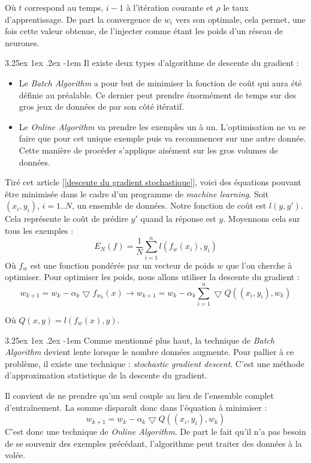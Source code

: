 \documentclass[a4paper, 11pt]{article}
\makeatletter
\renewcommand\paragraph{\@startsection{paragraph}{5}{\z@}%
  {3.25ex \@plus1ex \@minus.2ex}%
  {-1em}%
  {\normalfont\normalsize\bfseries}}
\makeatother
\begin{document}
Où $t$ correspond au temps, $i-1$ à l'itération courante et $\rho$ le taux d'apprentissage.
De part la convergence de $w_i$ vers son optimale, cela permet, une fois cette valeur obtenue, de l'injecter comme étant les poids d'un réseau de neurones.

\paragraph{}
Il existe deux types d'algorithme de descente du gradient :
\begin{itemize}
\item Le \textit{Batch Algorithm} a pour but de minimiser la fonction de coût qui aura été définie au préalable. Ce dernier peut prendre énormément de temps sur des gros jeux de données de par son côté itératif.
\item Le \textit{Online Algorithm} va prendre les exemples un à un. L'optimisation ne va se faire que pour cet unique exemple puis va recommencer sur une autre donnée. Cette manière de procéder s'applique aisément sur les gros volumes de données.
\end{itemize}

Tiré cet article [\ref{descente du gradient stochastique}], voici des équations pouvant être minimisée dans le cadre d'un programme de \textit{machine learning}.
Soit $(x_i,y_i)\text{,\ } i=1..N$, un ensemble de données. Notre fonction de coût est $l(y,y')$. Cela représente le coût de prédire $y'$ quand la réponse est $y$. Moyennons cela sur tous les exemples :
$$E_N(f) = \frac{1}{N} \sum_{i=1}^{n}l(f_w(x_i),y_i)$$
Où $f_w$ est une fonction pondérée par un vecteur de poids $w$ que l'on cherche à optimiser.
Pour optimiser les poids, nous allons utiliser la descente du gradient :
$$w_{k+1} = w_k - \alpha_k \bigtriangledown f_{w_k}(x) \rightarrow w_{k+1} = w_k -\alpha_k \sum_{i=1}^n \bigtriangledown Q ((x_i,y_i), w_k)$$

Où $Q(x,y) = l(f_w(x),y)$.

\paragraph{}
Comme mentionné plus haut, la technique de \textit{Batch Algorithm} devient lente lorsque le nombre données augmente. Pour pallier à ce problème, il existe une technique : \textit{stochastic gradient descent}. C'est une méthode d'approximation statistique de la descente du gradient.

Il convient de ne prendre qu'un seul couple au lieu de l'ensemble complet d'entraînement. La somme disparaît donc dans l'équation à minimiser :
$$w_{k+1} = w_k -\alpha_k \bigtriangledown Q ((x_i,y_i), w_k)$$
C'est donc une technique de \textit{Online Algorithm}. De part le fait qu'il n'a pas besoin de se souvenir des exemples précédant, l'algorithme peut traiter des données à la volée.
\end{document}
